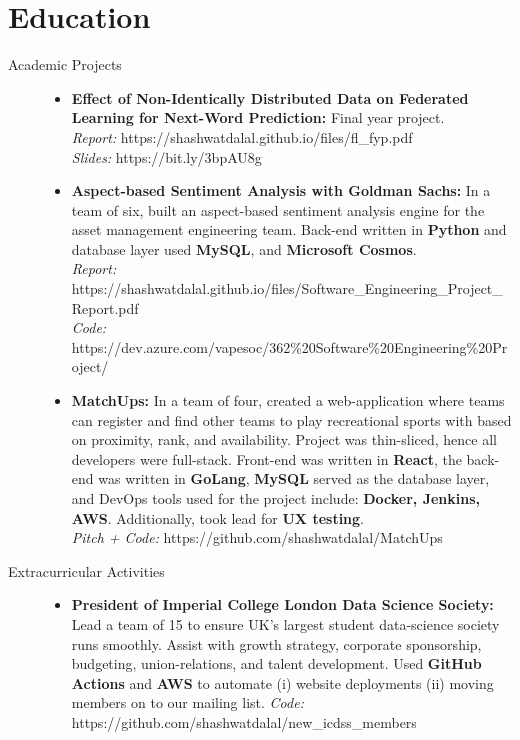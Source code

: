 \documentclass[a4paper]{deedy-resume} %
\begin{document}
\section{Education}
    \begin{description}
        \item[Academic Projects] \hspace{7.5cm}
            \begin{itemize}
                \item \textbf{Effect of Non-Identically Distributed Data on Federated Learning for Next-Word Prediction:} Final year project. \\
                \textit{Report: } https://shashwatdalal.github.io/files/fl\_fyp.pdf \\
                \textit{Slides: } https://bit.ly/3bpAU8g
                \item \textbf{Aspect-based Sentiment Analysis with Goldman Sachs:} In a team of six, built an aspect-based sentiment analysis engine for the asset management engineering team. Back-end written in \textbf{Python} and database layer used \textbf{MySQL}, and \textbf{Microsoft Cosmos}. \\
                \textit{Report:} https://shashwatdalal.github.io/files/Software\_Engineering\_Project\_Report.pdf \\ \textit{Code:} https://dev.azure.com/vapesoc/362\%20Software\%20Engineering\%20Project/
                \item \textbf{MatchUps:} In a team of four, created a web-application where teams can register and find other teams to play recreational sports with based on proximity, rank, and availability. Project was thin-sliced, hence all developers were full-stack. Front-end was written in \textbf{React}, the back-end was written in \textbf{GoLang}, \textbf{MySQL} served as the database layer, and DevOps tools used for the project include: \textbf{Docker, Jenkins, AWS}. Additionally, took lead for \textbf{UX testing}. \\
                \textit{Pitch + Code:} https://github.com/shashwatdalal/MatchUps
        \end{itemize}
         \item[Extracurricular Activities] \hspace{7.5cm}
            \begin{itemize}
                \item \textbf{President of Imperial College London Data Science Society:} Lead a team of 15 to ensure UK's largest student data-science society runs smoothly. Assist with growth strategy, corporate sponsorship, budgeting, union-relations, and talent development. Used \textbf{GitHub Actions} and \textbf{AWS} to automate (i) website deployments (ii) moving members on to our mailing list.
                \textit{Code:} https://github.com/shashwatdalal/new\_icdss\_members
        \end{itemize}
    \end{description}
\end{document}
